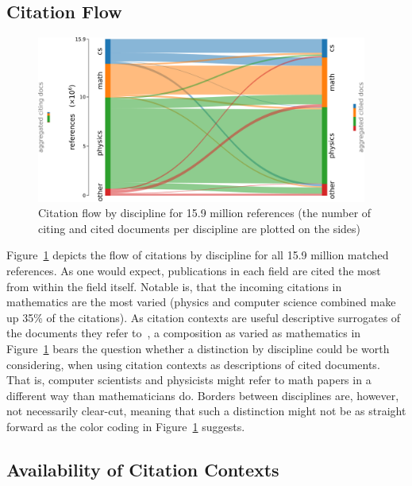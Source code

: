 \subsection{Citation Flow}

\begin{figure}
  \centering
    \includegraphics[width=0.97\textwidth]{figures/corpus/Fig7.pdf}
  \caption[Citation flow by discipline for 15.9 million references]{Citation flow by discipline for 15.9 million references (the number of citing and cited documents per discipline are plotted on the sides)}
  \label{fig:sankey}
\end{figure}

Figure~\ref{fig:sankey} depicts the flow of citations by discipline for all 15.9 million matched references. As one would expect, publications in each field are cited the most from within the field itself. Notable is, that the incoming citations in mathematics are the most varied (physics and computer science combined make up 35\% of the citations). As citation contexts are useful descriptive surrogates of the documents they refer to~\cite{Elkiss2008}, a composition as varied as mathematics in Figure~\ref{fig:sankey} bears the question whether a distinction by discipline could be worth considering, when using citation contexts as descriptions of cited documents. That is, computer scientists and physicists might refer to math papers in a different way than mathematicians do. Borders between disciplines are, however, not necessarily clear-cut, meaning that such a distinction might not be as straight forward as the color coding in Figure~\ref{fig:sankey} suggests.

\subsection{Availability of Citation Contexts}

